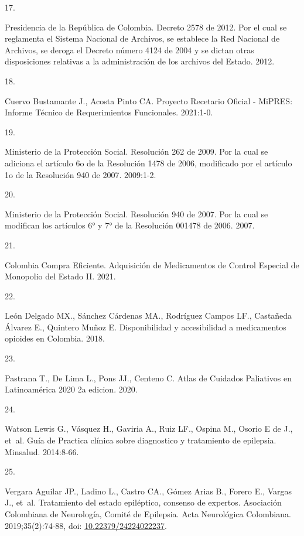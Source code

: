 \documentclass[
]{book}
\newlength{\cslhangindent}
\newlength{\csllabelwidth}
\newlength{\cslentryspacingunit} %
\newenvironment{CSLReferences}[2] %
 {%
  \setlength{\parindent}{0pt}
  \ifodd #1
  \let\oldpar\par
  \def\par{\hangindent=\cslhangindent\oldpar}
  \fi
  \setlength{\parskip}{#2\cslentryspacingunit}
 }%
 {}
\newcommand{\CSLLeftMargin}[1]{\parbox[t]{\csllabelwidth}{#1}}
\newcommand{\CSLRightInline}[1]{\parbox[t]{\linewidth - \csllabelwidth}{#1}\break}
\begin{document}
\begin{CSLReferences}{0}{0}
\leavevmode{}%
\CSLLeftMargin{17. }
\CSLRightInline{Presidencia de la República de Colombia. {Decreto 2578 de 2012. Por el cual se reglamenta el Sistema Nacional de Archivos, se establece la Red Nacional de Archivos, se deroga el Decreto n{ú}mero 4124 de 2004 y se dictan otras disposiciones relativas a la administraci{ó}n de los archivos del Estado.} 2012.}

\leavevmode{}%
\CSLLeftMargin{18. }
\CSLRightInline{Cuervo Bustamante J., Acosta Pinto CA. {Proyecto Recetario Oficial - MiPRES: Informe T{é}cnico de Requerimientos Funcionales}. 2021:1-0.}

\leavevmode{}%
\CSLLeftMargin{19. }
\CSLRightInline{Ministerio de la Protección Social. {Resoluci{ó}n 262 de 2009. Por la cual se adiciona el art{í}culo 6o de la Resoluci{ó}n 1478 de 2006, modificado por el art{í}culo 1o de la Resoluci{ó}n 940 de 2007.} 2009:1-2.}

\leavevmode{}%
\CSLLeftMargin{20. }
\CSLRightInline{Ministerio de la Protección Social. {Resoluci{ó}n 940 de 2007. Por la cual se modifican los art{í}culos 6° y 7° de la Resoluci{ó}n 001478 de 2006}. 2007.}

\leavevmode{}%
\CSLLeftMargin{21. }
\CSLRightInline{Colombia Compra Eficiente. {Adquisici{ó}n de Medicamentos de Control Especial de Monopolio del Estado II}. 2021.}

\leavevmode{}%
\CSLLeftMargin{22. }
\CSLRightInline{León Delgado MX., Sánchez Cárdenas MA., Rodríguez Campos LF., Castañeda Álvarez E., Quintero Muñoz E. {Disponibilidad y accesibilidad a medicamentos opioides en Colombia}. 2018.}

\leavevmode{}%
\CSLLeftMargin{23. }
\CSLRightInline{Pastrana T., De Lima L., Pons JJ., Centeno C. {Atlas de Cuidados Paliativos en Latinoam{é}rica 2020 2a edicion}. 2020.}

\leavevmode{}%
\CSLLeftMargin{24. }
\CSLRightInline{Watson Lewis G., Vásquez H., Gaviria A., Ruiz LF., Ospina M., Osorio E de J., et~al. {Gu{í}a de Practica cl{í}nica sobre diagnostico y tratamiento de epilepsia}. Minsalud. 2014:8-66.}

\leavevmode{}%
\CSLLeftMargin{25. }
\CSLRightInline{Vergara Aguilar JP., Ladino L., Castro CA., Gómez Arias B., Forero E., Vargas J., et~al. {Tratamiento del estado epil{é}ptico, consenso de expertos. Asociaci{ó}n Colombiana de Neurolog{í}a, Comit{é} de Epilepsia}. Acta Neurol{ó}gica Colombiana. 2019;35(2):74-88, doi: \href{https://doi.org/10.22379/24224022237}{10.22379/24224022237}.}


\end{CSLReferences}
\end{document}
